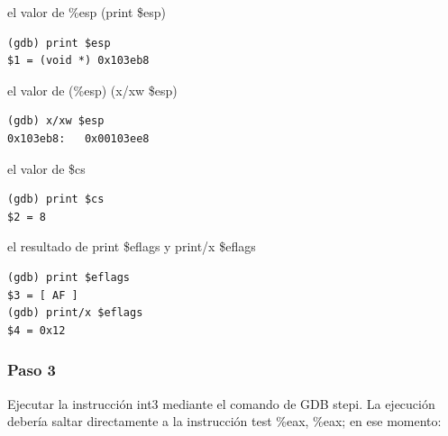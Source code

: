 \documentclass[a4paper]{article}
\begin{document}
\begin{list}{•}
\begin{lstlisting}
\end{lstlisting}

\item el valor de \%esp (print \$esp) \newline
\begin{lstlisting}
(gdb) print $esp
$1 = (void *) 0x103eb8
\end{lstlisting}

\item el valor de (\%esp) (x/xw \$esp)
\begin{lstlisting}
(gdb) x/xw $esp
0x103eb8:	0x00103ee8

\end{lstlisting}

\item el valor de \$cs
\begin{lstlisting}
(gdb) print $cs
$2 = 8
\end{lstlisting}

\item el resultado de print \$eflags y print/x \$eflags 
\begin{lstlisting}
(gdb) print $eflags
$3 = [ AF ]
(gdb) print/x $eflags
$4 = 0x12
\end{lstlisting}

\end{list}

\subsubsection*{Paso 3}
Ejecutar la instrucción int3 mediante el comando de GDB stepi. La ejecución debería saltar directamente a la instrucción test \%eax, \%eax; en ese momento:
\end{document}
